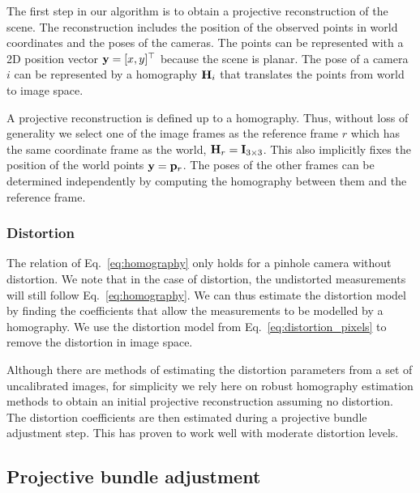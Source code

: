 \documentclass[10pt,twocolumn,letterpaper]{article}
\begin{document}
The first step in our algorithm is to obtain a projective reconstruction of the scene. The reconstruction includes the position of the observed points in world coordinates and the poses of the cameras. The points can be represented with a 2D position vector $\mathbf{y}=[x,y]^\top$ because the scene is planar. The pose of a camera $i$ can be represented by a homography $\mathbf{H}_i$ that translates the points from world to image space. 

A projective reconstruction is defined up to a homography. Thus, without loss of generality we select one of the image frames as the reference frame $r$ which has the same coordinate frame as the world, \ie $\mathbf{H}_r = \mathbf{I}_{3 \times 3}$. This also implicitly fixes the position of the world points $\mathbf{y}=\mathbf{p}_r$. The poses of the other frames can be determined independently by computing the homography between them and the reference frame.

\subsubsection{Distortion}
\label{sec:planar:distortion}

The relation of Eq.~\eqref{eq:homography} only holds for a pinhole camera without distortion. We note that in the case of distortion, the undistorted measurements will still follow Eq.~\eqref{eq:homography}. We can thus estimate the distortion model by finding the coefficients that allow the measurements to be modelled by a homography. We use the distortion model from Eq.~\eqref{eq:distortion_pixels} to remove the distortion in image space.

Although there are methods of estimating the distortion parameters from a set of uncalibrated images, for simplicity we rely here on robust homography estimation methods \cite{hartley2000} to obtain an initial projective reconstruction assuming no distortion. The distortion coefficients are then estimated during a projective bundle adjustment step. This has proven to work well with moderate distortion levels.

\subsection{Projective bundle adjustment}
\label{sec:projective:ba}
\end{document}
